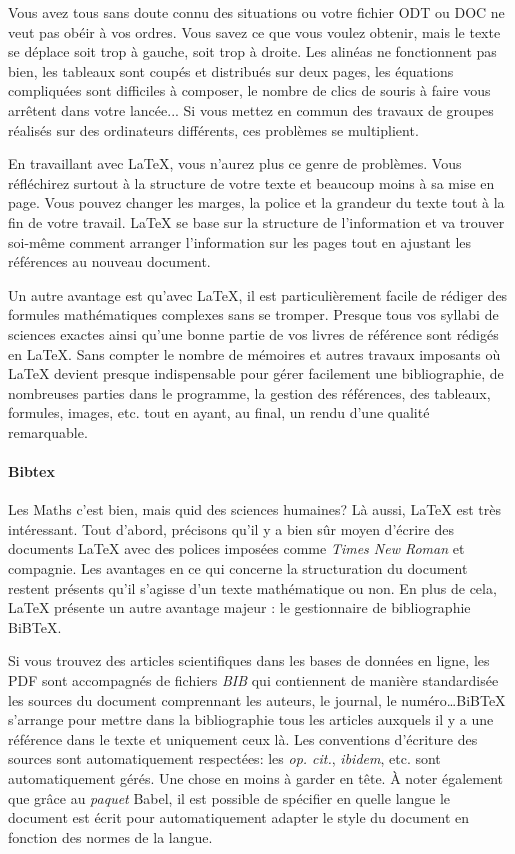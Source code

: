 \documentclass{../fiche}
\begin{document}
Vous avez tous sans doute connu des situations ou votre fichier ODT ou DOC ne veut pas obéir à vos ordres. Vous savez ce que vous voulez obtenir, mais le texte se déplace soit trop à gauche, soit trop à droite. Les alinéas ne fonctionnent pas bien, les tableaux sont coupés et distribués sur deux pages, les équations compliquées sont difficiles à composer, le nombre de clics de souris à faire vous arrêtent dans votre lancée... Si vous mettez en commun des travaux de groupes réalisés sur des ordinateurs différents, ces problèmes se multiplient.

En travaillant avec \LaTeX{}, vous n'aurez plus ce genre de problèmes. Vous réfléchirez surtout à la structure de votre texte et beaucoup moins à sa mise en page. Vous pouvez changer les marges, la police et la grandeur du texte tout à la fin de votre travail. \LaTeX{} se base sur la structure de l'information et va trouver soi-même comment arranger l'information sur les pages tout en ajustant les références au nouveau document.

Un autre avantage est qu'avec \LaTeX{}, il est particulièrement facile de rédiger des formules mathématiques complexes sans se tromper. Presque tous vos syllabi de sciences exactes ainsi qu'une bonne partie de vos livres de référence sont rédigés en \LaTeX{}. Sans compter le nombre de mémoires et autres travaux imposants où \LaTeX{} devient presque indispensable pour gérer facilement une bibliographie, de nombreuses parties dans le programme, la gestion des références, des tableaux, formules, images, etc. tout en ayant, au final, un rendu d'une qualité remarquable.

\paragraph{Bibtex}
Les Maths c'est bien, mais quid des sciences humaines? Là aussi, \LaTeX{} est très intéressant. Tout d'abord, précisons qu'il y a bien sûr moyen d'écrire des documents \LaTeX{} avec des polices imposées comme \textit{Times New Roman} et compagnie.
Les avantages en ce qui concerne la structuration du document restent présents qu'il s'agisse d'un texte mathématique ou non. En plus de cela, \LaTeX{} présente un autre avantage majeur : le gestionnaire de bibliographie BiB\TeX{}.

Si vous trouvez des articles scientifiques dans les bases de données en ligne, les PDF sont accompagnés de fichiers \textit{BIB} qui contiennent de manière standardisée les sources du document comprennant les auteurs, le journal, le numéro\dots BiB\TeX{} s'arrange pour mettre dans la bibliographie tous les articles auxquels il y a une référence dans le texte et uniquement ceux là. Les conventions d'écriture des sources sont automatiquement respectées: les \textit{op. cit.}, \textit{ibidem}, etc. sont automatiquement gérés. Une chose en moins à garder en tête.
À noter également que grâce au \textit{paquet} Babel, il est possible de spécifier en quelle langue le document est écrit pour automatiquement adapter le style du document en fonction des normes de la langue.
\end{document}
